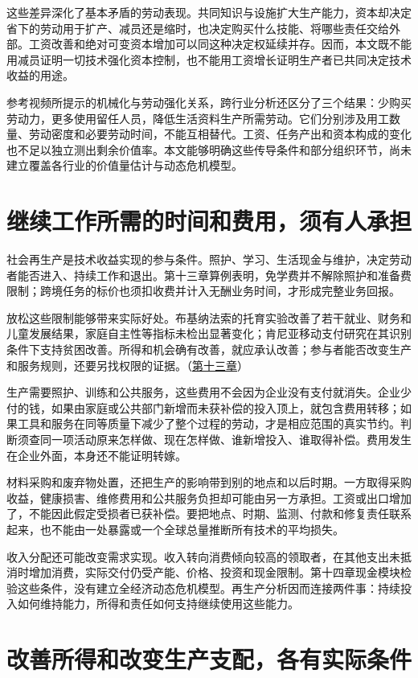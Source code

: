 \documentclass[UTF8,fontset=windows,12pt,a4paper,oneside,openany]{ctexbook}
\begin{document}
这些差异深化了基本矛盾的劳动表现。共同知识与设施扩大生产能力，资本却决定省下的劳动用于扩产、减员还是缩时，也决定购买什么技能、将哪些责任交给外部。工资改善和绝对可变资本增加可以同这种决定权延续并存。因而，本文既不能用减员证明一切技术强化资本控制，也不能用工资增长证明生产者已共同决定技术收益的用途。

参考视频所提示的机械化与劳动强化关系，跨行业分析还区分了三个结果：少购买劳动力，更多使用留任人员，降低生活资料生产所需劳动。它们分别涉及用工数量、劳动密度和必要劳动时间，不能互相替代。工资、任务产出和资本构成的变化也不足以独立测出剩余价值率。本文能够明确这些传导条件和部分组织环节，尚未建立覆盖各行业的价值量估计与动态危机模型。

\section{继续工作所需的时间和费用，须有人承担}

社会再生产是技术收益实现的参与条件。照护、学习、生活现金与维护，决定劳动者能否进入、持续工作和退出。第十三章算例表明，免学费并不解除照护和准备费限制；跨境任务的标价也须扣收费并计入无酬业务时间，才形成完整业务回报。

放松这些限制能够带来实际好处。布基纳法索的托育实验改善了若干就业、财务和儿童发展结果，家庭自主性等指标未检出显著变化；肯尼亚移动支付研究在其识别条件下支持贫困改善。所得和机会确有改善，就应承认改善；参与者能否改变生产和服务规则，还要另找权限的证据。（\hyperref[ch:13]{第十三章}）

生产需要照护、训练和公共服务，这些费用不会因为企业没有支付就消失。企业少付的钱，如果由家庭或公共部门新增而未获补偿的投入顶上，就包含费用转移；如果工具和服务在同等质量下减少了整个过程的劳动，才是相应范围的真实节约。判断须查同一项活动原来怎样做、现在怎样做、谁新增投入、谁取得补偿。费用发生在企业外面，本身还不能证明转嫁。

材料采购和废弃物处置，还把生产的影响带到别的地点和以后时期。一方取得采购收益，健康损害、维修费用和公共服务负担却可能由另一方承担。工资或出口增加了，不能因此假定受损者已获补偿。要把地点、时期、监测、付款和修复责任联系起来，也不能由一处暴露或一个全球总量推断所有技术的平均损失。

收入分配还可能改变需求实现。收入转向消费倾向较高的领取者，在其他支出未抵消时增加消费，实际交付仍受产能、价格、投资和现金限制。第十四章现金模块检验这些条件，没有建立全经济动态危机模型。再生产分析因而连接两件事：持续投入如何维持能力，所得和责任如何支持继续使用这些能力。

\section{改善所得和改变生产支配，各有实际条件}
\end{document}

